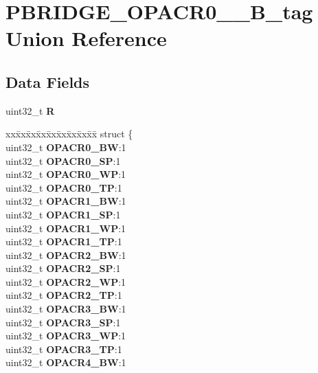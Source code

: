\hypertarget{unionPBRIDGE__OPACR0__7__32B__tag}{}\section{P\+B\+R\+I\+D\+G\+E\+\_\+\+O\+P\+A\+C\+R0\+\_\+\_\+B\+\_\+tag Union Reference}
\label{unionPBRIDGE__OPACR0__7__32B__tag}
\subsection*{Data Fields}
\begin{DoxyCompactItemize}
\item 
\mbox{\label{unionPBRIDGE__OPACR0__7__32B__tag_aa097e24f383a7a743e0d2c0c6034a741}} 
uint32\+\_\+t {\bfseries R}
\item 
\mbox{\label{unionPBRIDGE__OPACR0__7__32B__tag_a8674fa9a80babd64f51c83d68d1da20b}} 
\begin{tabbing}
xx\=xx\=xx\=xx\=xx\=xx\=xx\=xx\=xx\=\kill
struct \{\\
\>uint32\_t {\bfseries OPACR0\_BW}:1\\
\>uint32\_t {\bfseries OPACR0\_SP}:1\\
\>uint32\_t {\bfseries OPACR0\_WP}:1\\
\>uint32\_t {\bfseries OPACR0\_TP}:1\\
\>uint32\_t {\bfseries OPACR1\_BW}:1\\
\>uint32\_t {\bfseries OPACR1\_SP}:1\\
\>uint32\_t {\bfseries OPACR1\_WP}:1\\
\>uint32\_t {\bfseries OPACR1\_TP}:1\\
\>uint32\_t {\bfseries OPACR2\_BW}:1\\
\>uint32\_t {\bfseries OPACR2\_SP}:1\\
\>uint32\_t {\bfseries OPACR2\_WP}:1\\
\>uint32\_t {\bfseries OPACR2\_TP}:1\\
\>uint32\_t {\bfseries OPACR3\_BW}:1\\
\>uint32\_t {\bfseries OPACR3\_SP}:1\\
\>uint32\_t {\bfseries OPACR3\_WP}:1\\
\>uint32\_t {\bfseries OPACR3\_TP}:1\\
\>uint32\_t {\bfseries OPACR4\_BW}:1\\

\end{tabbing}
\end{DoxyCompactItemize}
